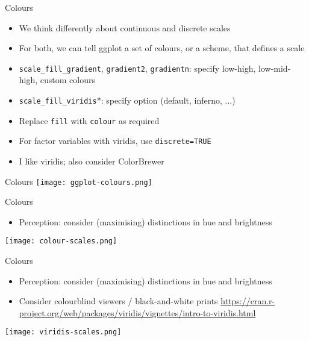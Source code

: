 \documentclass[10pt]{beamer}
\begin{document}
\begin{frame}{Colours}
   \begin{itemize}
   \item We think differently about continuous and discrete scales
   \item For both, we can tell ggplot a set of colours, or a scheme, that defines a scale
     \item \texttt{scale\_fill\_gradient}, \texttt{gradient2}, \texttt{gradientn}: specify low-high, low-mid-high, custom colours
     \item \texttt{scale\_fill\_viridis}*: specify option (default, inferno, ...)
     \item Replace \texttt{fill} with \texttt{colour} as required
     \item For factor variables with viridis, use \texttt{discrete=TRUE}
       \item I like viridis; also consider ColorBrewer
     \end{itemize}
\end{frame}

\begin{frame}{Colours}
  \texttt{[image: ggplot-colours.png]}
\end{frame}

\begin{frame}{Colours}
   \begin{itemize}
   \item Perception: consider (maximising) distinctions in hue and brightness
     \end{itemize}
   \texttt{[image: colour-scales.png]}
\end{frame}

\begin{frame}{Colours}
   \begin{itemize}
   \item Perception: consider (maximising) distinctions in hue and brightness
     \item Consider colourblind viewers / black-and-white prints \url{https://cran.r-project.org/web/packages/viridis/vignettes/intro-to-viridis.html}
     \end{itemize}
   \texttt{[image: viridis-scales.png]}
\end{frame}
\end{document}
